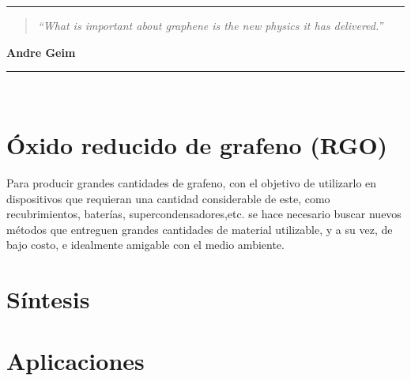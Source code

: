 \noindent
\rule{\linewidth}{1 pt}
\begin{flushright}
	\begin{quotation}
		\small{
			\textit{``What is important about graphene is the new physics it has delivered.''}}
	\end{quotation}
	\bf{Andre Geim}
\end{flushright}
\noindent
\rule{\linewidth}{1 pt}\\
\vfill

\section{Óxido reducido de grafeno (RGO)}
Para producir grandes cantidades de grafeno, con el objetivo de utilizarlo en dispositivos que requieran una cantidad considerable de este, como recubrimientos, baterías, supercondensadores,etc. se hace necesario buscar nuevos métodos que entreguen grandes cantidades de material utilizable, y a su vez, de bajo costo, e idealmente amigable con el medio ambiente. 
\section{Síntesis}

\section{Aplicaciones}